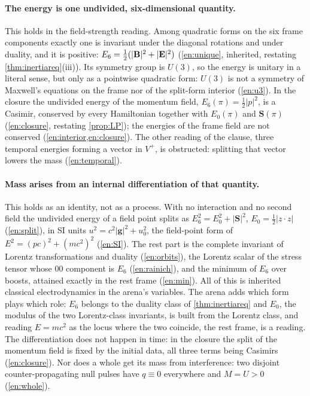 \paragraph{The energy is one undivided, six-dimensional quantity.} This holds in the field-strength reading. Among quadratic forms on the six
frame components exactly one is invariant under the diagonal rotations and under duality, and it is positive: $E_6=\tfrac12(|\mathbf B|^2+|\mathbf E|^2)$
(\cref{en:unique}, inherited, restating \cref{thm:inertiareq}(iii)). Its symmetry group is $U(3)$, so the energy is unitary in a literal sense, but
only as a pointwise quadratic form: $U(3)$ is not a symmetry of Maxwell's equations on the frame nor of the split-form interior (\cref{en:u3}). In
the closure the undivided energy of the momentum field, $E_6(\pi)=\tfrac12|p|^2$, is a Casimir, conserved by every Hamiltonian together with
$E_0(\pi)$ and $\mathbf S(\pi)$ (\cref{en:closure}, restating \cref{prop:LP}); the energies of the frame field are not conserved
(\cref{en:interior,en:closure}). The other reading of the clause, three temporal energies forming a vector in $V^+$, is obstructed: splitting that
vector lowers the mass (\cref{en:temporal}).

\paragraph{Mass arises from an internal differentiation of that quantity.} This holds as an identity, not as a process. With no interaction and no
second field the undivided energy of a field point splits as $E_6^2=E_0^2+|\mathbf S|^2$, $E_0=\tfrac12|z\cdot z|$ (\cref{en:split}), in SI units
$u^2=c^2|\mathbf g|^2+u_0^2$, the field-point form of $E^2=(pc)^2+(mc^2)^2$ (\cref{en:SI}). The rest part is the complete invariant of Lorentz
transformations and duality (\cref{en:orbits}), the Lorentz scalar of the stress tensor whose $00$ component is $E_6$ (\cref{en:rainich}), and the
minimum of $E_6$ over boosts, attained exactly in the rest frame (\cref{en:min}). All of this is inherited classical electrodynamics in the arena's
variables. The arena adds which form plays which role: $E_6$ belongs to the duality class of \cref{thm:inertiareq} and $E_0$, the modulus of the two
Lorentz-class invariants, is built from the Lorentz class, and reading $E=mc^2$ as the locus where the two coincide, the rest frame, is a reading. The
differentiation does not happen in time: in the closure the split of the momentum field is fixed by the initial data, all three terms being
Casimirs (\cref{en:closure}). Nor does a whole get its mass from interference: two disjoint counter-propagating null pulses have $q\equiv0$ everywhere
and $M=U>0$ (\cref{en:whole}).

